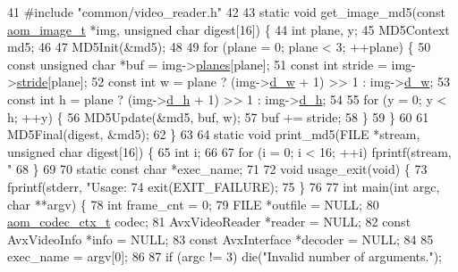 \begin{DoxyCodeInclude}
41 \textcolor{preprocessor}{#include "common/video\_reader.h"}
42 
43 \textcolor{keyword}{static} \textcolor{keywordtype}{void} get\_image\_md5(\textcolor{keyword}{const} \hyperlink{structaom__image}{aom\_image\_t} *img, \textcolor{keywordtype}{unsigned} \textcolor{keywordtype}{char} digest[16]) \{
44   \textcolor{keywordtype}{int} plane, y;
45   MD5Context md5;
46 
47   MD5Init(&md5);
48 
49   \textcolor{keywordflow}{for} (plane = 0; plane < 3; ++plane) \{
50     \textcolor{keyword}{const} \textcolor{keywordtype}{unsigned} \textcolor{keywordtype}{char} *buf = img->\hyperlink{structaom__image_ac54dbc5237ca2914f9ec30105dfbe302}{planes}[plane];
51     \textcolor{keyword}{const} \textcolor{keywordtype}{int} stride = img->\hyperlink{structaom__image_a6dc693d7dbc9eb06c0cdde307ca58372}{stride}[plane];
52     \textcolor{keyword}{const} \textcolor{keywordtype}{int} w = plane ? (img->\hyperlink{structaom__image_a89f80b1f58d608b9d2080635f4359034}{d\_w} + 1) >> 1 : img->\hyperlink{structaom__image_a89f80b1f58d608b9d2080635f4359034}{d\_w};
53     \textcolor{keyword}{const} \textcolor{keywordtype}{int} h = plane ? (img->\hyperlink{structaom__image_ab986419a1f0fff93a2dc505f47194988}{d\_h} + 1) >> 1 : img->\hyperlink{structaom__image_ab986419a1f0fff93a2dc505f47194988}{d\_h};
54 
55     \textcolor{keywordflow}{for} (y = 0; y < h; ++y) \{
56       MD5Update(&md5, buf, w);
57       buf += stride;
58     \}
59   \}
60 
61   MD5Final(digest, &md5);
62 \}
63 
64 \textcolor{keyword}{static} \textcolor{keywordtype}{void} print\_md5(FILE *stream, \textcolor{keywordtype}{unsigned} \textcolor{keywordtype}{char} digest[16]) \{
65   \textcolor{keywordtype}{int} i;
66 
67   \textcolor{keywordflow}{for} (i = 0; i < 16; ++i) fprintf(stream, \textcolor{stringliteral}{"%
68 \}
69 
70 \textcolor{keyword}{static} \textcolor{keyword}{const} \textcolor{keywordtype}{char} *exec\_name;
71 
72 \textcolor{keywordtype}{void} usage\_exit(\textcolor{keywordtype}{void}) \{
73   fprintf(stderr, \textcolor{stringliteral}{"Usage: %
74   exit(EXIT\_FAILURE);
75 \}
76 
77 \textcolor{keywordtype}{int} main(\textcolor{keywordtype}{int} argc, \textcolor{keywordtype}{char} **argv) \{
78   \textcolor{keywordtype}{int} frame\_cnt = 0;
79   FILE *outfile = NULL;
80   \hyperlink{structaom__codec__ctx}{aom\_codec\_ctx\_t} codec;
81   AvxVideoReader *reader = NULL;
82   \textcolor{keyword}{const} AvxVideoInfo *info = NULL;
83   \textcolor{keyword}{const} AvxInterface *decoder = NULL;
84 
85   exec\_name = argv[0];
86 
87   \textcolor{keywordflow}{if} (argc != 3) die(\textcolor{stringliteral}{"Invalid number of arguments."});
}}
\end{DoxyCodeInclude}
